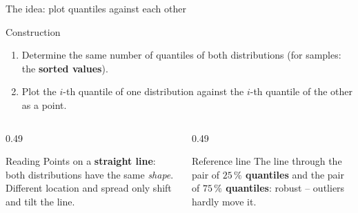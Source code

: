 \documentclass[aspectratio=169,11pt]{beamer}
\begin{document}
\begin{frame}{The idea: plot quantiles against each other}
  \begin{block}{Construction}
    \begin{enumerate}
      \item Determine the same number of quantiles of both distributions (for
            samples: the \textbf{sorted values}).
      \item Plot the $i$-th quantile of one distribution against the $i$-th
            quantile of the other as a point.
    \end{enumerate}
  \end{block}

  \begin{columns}[T]
    \begin{column}{0.49\textwidth}
      \begin{exampleblock}{Reading}
        Points on a \textbf{straight line}: both distributions have the same
        \emph{shape}. Different location and spread only shift and tilt the
        line.
      \end{exampleblock}
    \end{column}
    \begin{column}{0.49\textwidth}
      \begin{block}{Reference line}
        The line through the pair of \textbf{$25\,\%$ quantiles} and the pair
        of \textbf{$75\,\%$ quantiles}: robust -- outliers hardly move it.
      \end{block}
    \end{column}
  \end{columns}

\end{frame}
\end{document}

